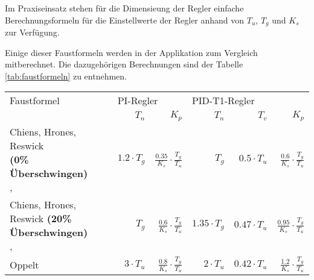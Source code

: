 Im   Praxiseinsatz  stehen   f\"ur   die  Dimensieung   der  Regler   einfache
Berechnungsformeln f\"ur die Einstellwerte der  Regler anhand von $T_u$, $T_g$
und $K_s$ zur Verf\"ugung.

Einige   dieser  Faustformeln   werden  in   der  Applikation   zum  Vergleich
mitberechnet. Die    dazugeh\"origen    Berechnungen    sind    der    Tabelle
\ref{tab:faustformeln} zu entnehmen.

\begin{longtable}{p{50mm}rrrrr}
    \toprule


    Faustformel
    &
    \multicolumn{2}{l}{PI-Regler}
    &
    \multicolumn{2}{l}{PID-T1-Regler}
    \\

    &
    $T_n$
    &
    $K_p$
    &
    $T_n$
    &
    $T_v$
    &
    $K_p$
    \\

    \midrule

    \endhead
    \endfoot
    \endlastfoot


    \pbox{45mm}{Chiens, Hrones, Reswick \\ \small{\textbf{(0\% \"Uberschwingen)}} \\ \cite{ref:chiens_tsn}, \cite{ref:chiens_wiki}}
    &
    $1.2\cdot T_g$
    &
    $\frac{0.35}{K_s} \cdot \frac{T_g}{T_u}$
    &
    $T_g$
    &
    $0.5\cdot T_u$
    &
    $ \frac{0.6}{K_s} \cdot \frac{T_g}{T_u} $
    \\

    \addlinespace[1em]

    \pbox{45mm}{Chiens, Hrones, Reswick \small{\textbf{(20\% \"Uberschwingen)}} \\ \cite{ref:chiens_tsn}, \cite{ref:chiens_wiki}}
    &
    $T_g$
    &
    $\frac{0.6}{K_s} \cdot \frac{T_g}{T_u}$
    &
    $1.35\cdot T_g$
    &
    $0.47 \cdot T_u$
    &
    $ \frac{0.95}{K_s} \cdot \frac{T_g}{T_u} $
    \\

    \addlinespace[1em]

    Oppelt \cite{ref:op_ros_zieg}
    &
    $3 \cdot T_u$
    &
    $\frac{0.8}{K_s} \cdot \frac{T_g}{T_u}$
    &
    $2 \cdot T_u$
    &
    $ 0.42 \cdot T_u $
    &
    $ \frac{1.2}{K_s} \cdot \frac{T_g}{T_u} $
    \\


\end{longtable}
